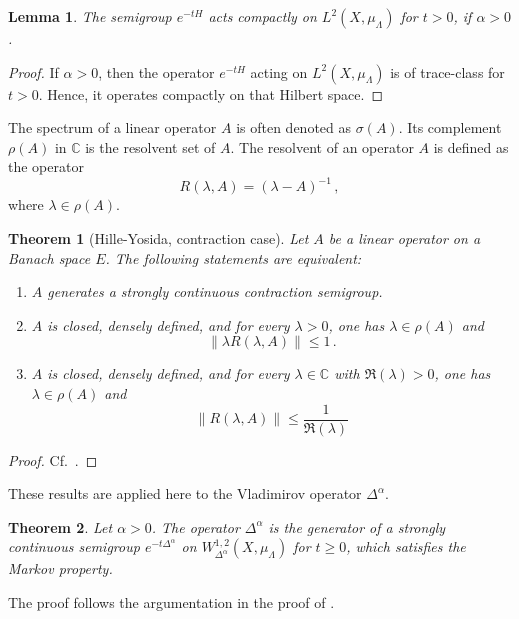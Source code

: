 \documentclass[a4paper,draft]{ZbRad}
\theoremstyle{plain}
\newtheorem{thm}{Theorem}[section]
\newtheorem{lem}{Lemma}[section]
\theoremstyle{definition}
\numberwithin{equation}{section}
\renewcommand{\le}{\leqslant}\renewcommand{\leq}{\leqslant}
\renewcommand{\ge}{\geqslant}\renewcommand{\geq}{\geqslant}
\newcommand{\norm}[1]{\left\|#1\right\|}
\begin{document}
\begin{lem}
The semigroup $e^{-tH}$ acts compactly on $L^2(X,\mu_\Lambda)$ for $t>0$, if
$\alpha > 0$.
\end{lem}

\begin{proof}
If $\alpha > 0$, 
then the operator $e^{-tH}$ acting on 
$L^2(X,\mu_\Lambda)$ is of trace-class
for $t > 0$. Hence, it operates compactly on that Hilbert space.
\end{proof}

The spectrum of a linear operator $A$ is often denoted as $\sigma(A)$. Its complement $\rho(A)$ in $\mathbb{C}$ is the resolvent set of $A$. The resolvent of an operator $A$ is
defined as the operator
\[
R(\lambda, A) = (\lambda - A)^{-1}\,,
\]
where $\lambda\in\rho(A)$.

\begin{thm}[Hille-Yosida, contraction case]\label{HilleYosidaContraction}
 Let $A$ be a linear operator on
a Banach space $E$. The following statements are equivalent:
\begin{enumerate}
\item $A$ generates a strongly continuous contraction semigroup.
\item $A$ is closed, densely defined, and for every $\lambda > 0$, one has $\lambda\in\rho(A)$ and
\[
\norm{\lambda R(\lambda, A)}\le 1\,.
\]
\item
$A$ is closed, densely defined, and for every $\lambda\in\mathbb{C}$ with $\Re(\lambda)>0$, one has
$\lambda\in\rho(A)$ and
\[
\norm{R(\lambda, A)}\le\frac{1}{\Re(\lambda)}
\]
\end{enumerate}
\end{thm}

\begin{proof}
Cf.\ \cite[Theorem II.3.5]{EK2000}.
\end{proof}

These results are applied here to the Vladimirov operator $\Delta^\alpha$.

\begin{thm}\label{VTMarkov}
Let $\alpha > 0$. 
The operator $\Delta^\alpha$ is the generator of a strongly continuous semigroup $e^{-t\Delta^\alpha}$ on $W_{\Delta^\alpha}^{1,2}(X,\mu_\Lambda)$ for $t \ge0$, which satisfies the Markov
property.
\end{thm}

The proof follows the argumentation in the proof of \cite[Theorem 6.3]{ellipticBVP}.
\end{document}
